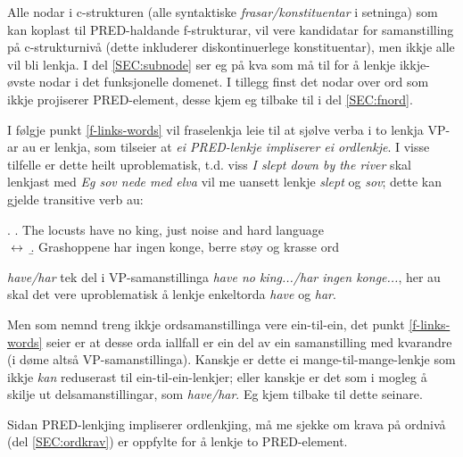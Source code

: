 \documentclass[11pt,a4paper,oneside,draft]{book}
\begin{document}
Alle nodar i c-strukturen (alle syntaktiske \emph{frasar/konstituentar} i
setninga) som kan koplast til PRED-haldande f-strukturar, vil vere
kandidatar for samanstilling på c-strukturnivå (dette inkluderer
diskontinuerlege konstituentar), men ikkje alle vil bli lenkja.  I del
\ref{SEC:subnode} ser eg på kva som må til for å lenkje ikkje-øvste
nodar i det funksjonelle domenet.
I tillegg finst det nodar over ord som ikkje projiserer PRED-element,
desse kjem eg tilbake til i del \ref{SEC:fnord}.

I følgje punkt \ref{f-links-words} vil fraselenkja leie til at sjølve
verba i to lenkja VP-ar au er lenkja, som tilseier at \emph{ei PRED-lenkje impliserer ei ordlenkje}. I visse tilfelle er dette heilt
uproblematisk, t.d. viss \emph{I slept down by the river} skal lenkjast med
\emph{Eg sov nede med elva} vil me uansett lenkje \emph{slept} og \emph{sov}; dette
kan gjelde transitive verb au:

\ex. \a. The locusts have no king, just noise and hard language\\
     $\leftrightarrow$
     \b. Grashoppene har ingen konge, berre støy og krasse ord



\emph{have/har} tek del i VP-samanstillinga \emph{have no king.../har
ingen konge...}, her au skal det vere uproblematisk å lenkje
enkeltorda \emph{have} og \emph{har}.

Men som nemnd treng ikkje ordsamanstillinga vere ein-til-ein, det
punkt \ref{f-links-words} seier er at desse orda iallfall er ein del
av ein samanstilling med kvarandre (i døme \Last altså
VP-samanstillinga). Kanskje er dette ei mange-til-mange-lenkje som
ikkje \emph{kan} reduserast til ein-til-ein-lenkjer; eller kanskje er
det som i \Last mogleg å skilje ut delsamanstillingar, som
\emph{have/har}. Eg kjem tilbake til dette
 seinare.

Sidan PRED-lenkjing impliserer ordlenkjing, må me sjekke om krava på
ordnivå (del \ref{SEC:ordkrav}) er oppfylte for å lenkje to
PRED-element. 
\end{document}
